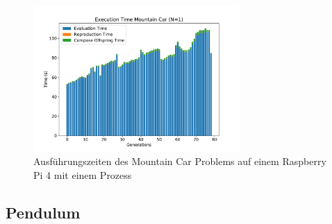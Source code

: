 \\\\
\begin{figure}[!h]
	\centering
	\includegraphics[width=0.7\textwidth]{./img/mountain_car_single/1413_time_1core_1pi.pdf} 
	\caption{Ausführungszeiten des Mountain Car Problems auf einem Raspberry Pi 4 mit einem Prozess}
	\label{fig:mountain_car_time_single_core}
\end{figure}



\subsection{Pendulum}



